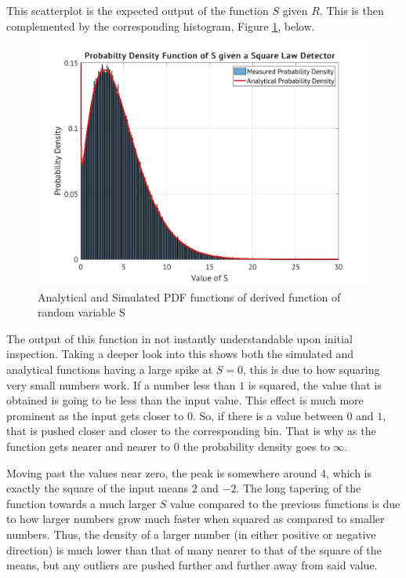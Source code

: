 \documentclass[a4paper, 11pt]{article}
\begin{document}
\noindent
This scatterplot is the expected output of the function \(S\) given \(R\). This is then complemented by the corresponding histogram, Figure \ref{fig:S3PDF}, below.

\begin{figure}[htbp]
\centering
\includegraphics[width=.9\linewidth]{./Images/S3PDF8.jpg}
\caption{\label{fig:S3PDF}Analytical and Simulated PDF functions of derived function of random variable S}
\end{figure}

\bigskip
\noindent
The output of this function in not instantly understandable upon initial inspection.
Taking a deeper look into this shows both the simulated and analytical functions having a large spike at \(S = 0\), this is due to how squaring very small numbers work.
If a number less than \(1\) is squared, the value that is obtained is going to be less than the input value. This effect is much more prominent as the input gets closer to \(0\).
So, if there is a value between \(0\) and \(1\), that is pushed closer and closer to the corresponding bin.
That is why as the function gets nearer and nearer to \(0\) the probability density goes to \(\infty\).

\bigskip
\noindent
Moving past the values near zero, the peak is somewhere around \(4\), which is exactly the square of the input means \(2\) and \(-2\). The long tapering of the function towards a much larger \(S\) value compared to the previous functions is due to how larger numbers grow much faster when squared as compared to smaller numbers. Thus, the density of a larger number (in either positive or negative direction) is much lower than that of many nearer to that of the square of the means, but any outliers are pushed further and further away from said value.
\end{document}
